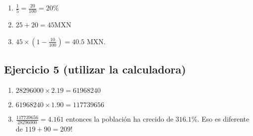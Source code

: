 \begin{enumerate}
\item $\frac{1}{5} = \frac{20}{100} = 20\%$
\item $25+20=45$MXN
\item $45 \times \left(1 -  \frac{10}{100}\right) = 40.5$ MXN.
\end{enumerate}

\subsection*{Ejercicio 5 (utilizar la calculadora)}

\begin{enumerate}
\item $28296000 \times 2.19 = 61968240$
\item $61968240 \times 1.90 = 117739656$
\item $\frac{117739656}{28296000} = 4.161$ entonces la población ha crecido de
  $316.1\%$. Eso es diferente de $119 + 90 = 209$!
\end{enumerate}
